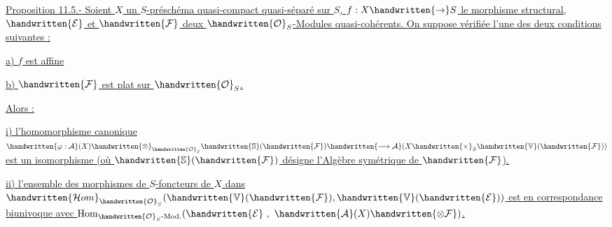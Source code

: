 \uline{Proposition 11.5.- Soient $X$ un $S$-préschéma quasi-compact quasi-séparé sur $S$, $f:X\handwritten{\to}S$ le morphisme structural, $\handwritten{\mathcal{E}}$ et $\handwritten{\mathcal{F}}$ deux $\handwritten{\mathcal{O}}_S$-Modules quasi-cohérents. On suppose vérifiée l'une des deux conditions suivantes :}

\uline{a) $f$ est affine}

\uline{b) $\handwritten{\mathcal{F}}$ est plat sur $\handwritten{\mathcal{O}}_S$.}

\uline{Alors :}

\uline{i) l'homomorphisme canonique $\handwritten{\varphi:\mathcal{A}}(X)\handwritten{\otimes}_{\handwritten{\mathcal{O}}_S}\handwritten{\mathbb{S}}(\handwritten{\mathcal{F}})\handwritten{\longrightarrow\mathcal{A}}(X\handwritten{\times}_S\handwritten{\mathbb{V}}(\handwritten{\mathcal{F}}))$ est un isomorphisme (où $\handwritten{\mathbb{S}}(\handwritten{\mathcal{F}})$ désigne l'Algèbre symétrique de $\handwritten{\mathcal{F}}$).}

\uline{ii) l'ensemble des morphismes de $S$-foncteurs de $X$ dans $\handwritten{\mathcal{H}om}_{\handwritten{\mathcal{O}}_S}(\handwritten{\mathbb{V}}(\handwritten{\mathcal{F}}),\handwritten{\mathbb{V}}(\handwritten{\mathcal{E}}))$ est en correspondance biunivoque avec $\operatorname{Hom}_{\handwritten{\mathcal{O}}_S\text{-}\mathrm{Mod.}}(\handwritten{\mathcal{E}}\ ,\ \handwritten{\mathcal{A}}(X)\handwritten{\otimes\mathcal{F}})$.}

